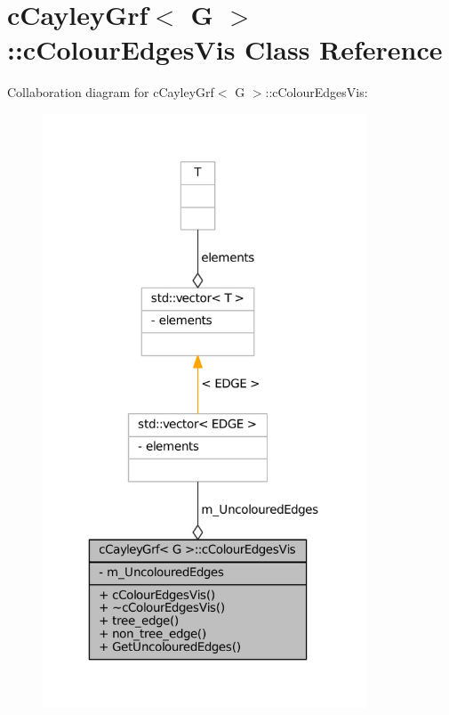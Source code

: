\hypertarget{classcCayleyGrf_1_1cColourEdgesVis}{
\section{c\-Cayley\-Grf$<$ \-G $>$\-:\-:c\-Colour\-Edges\-Vis \-Class \-Reference}
\label{classcCayleyGrf_1_1cColourEdgesVis}
}


\-Collaboration diagram for c\-Cayley\-Grf$<$ \-G $>$\-:\-:c\-Colour\-Edges\-Vis\-:
\nopagebreak
\begin{figure}[H]
\begin{center}
\leavevmode
\includegraphics[width=274pt]{classcCayleyGrf_1_1cColourEdgesVis__coll__graph}
\end{center}
\end{figure}
